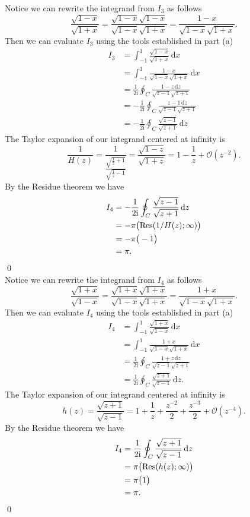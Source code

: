 \documentclass[10pt]{amsart}
\newcommand{\D}{\mathrm{d}}
\newcommand{\I}{\mathrm{i}}
\theoremstyle{nonumberplain}
\begin{document}
\begin{enumerate}[label={\bf {\arabic*}:}]
\begin{enumerate}
\noindent
Notice we can rewrite the integrand from $I_3$ as follows
$$
\frac{\sqrt{1 -x}}{ \sqrt{1 + x}} = \frac{\sqrt{1 -x}\sqrt{1 -x}}{\sqrt{1 -x}\sqrt{1 + x}} = \frac{1 - x}{\sqrt{1 - x}\sqrt{1 + x}}.
$$
Then we can evaluate $I_3$ using the tools established in part (a)
\begin{align*}
I_3 &= \int_{-1}^1 \frac{\sqrt{1 -x}}{ \sqrt{1 + x}}\, \D x \\
	&= \int_{-1}^1 \frac{1 - x}{\sqrt{1 - x}\sqrt{1 + x}}\, \D x \\
	&= \frac{1}{2\I} \oint_C \frac{1 - z\, \D z}{\sqrt{z -1} \sqrt{z + 1}} \\
	&= - \frac{1}{2\I} \oint_C \frac{z - 1\, \D z}{\sqrt{z -1} \sqrt{z + 1}} \\
	&= - \frac{1}{2\I} \oint_C \frac{\sqrt{z - 1}}{\sqrt{z + 1}}\, \D z
\end{align*}
The Taylor expansion of our integrand centered at infinity is
$$ \frac 1 {H(z)} = \frac 1 {\frac{\sqrt{\frac 1 z + 1}}{\sqrt{\frac 1 z - 1}}} = \frac{\sqrt{1 - z}}{\sqrt{1 + z}} = 1 - \frac 1 z + \mathcal O(z^{-2}). $$
By the Residue theorem we have
\begin{align*}
I_4 &= - \frac{1}{2\I} \oint_C \frac{\sqrt{z - 1}}{\sqrt{z + 1}}\, \D z \\
	&= -\pi \big( {\rm Res}( 1/H(z); \infty) \big) \\
	&= - \pi \big( -1 \big) \\
	&= \pi.
\end{align*}
\qed \\

\noindent
Notice we can rewrite the integrand from $I_4$ as follows
$$
\frac{\sqrt{1 + x}}{ \sqrt{1- x}} = \frac{\sqrt{1+ x}\sqrt{1+ x}}{\sqrt{1- x}\sqrt{1 + x}} = \frac{1 + x}{\sqrt{1 - x}\sqrt{1 + x}}.
$$
Then we can evaluate $I_4$ using the tools established in part (a)
\begin{align*}
I_4 &= \int_{-1}^1 \frac{\sqrt{1 + x}}{ \sqrt{1- x}}\, \D x \\
	&= \int_{-1}^1 \frac{1 + x}{\sqrt{1 - x}\sqrt{1 + x}}\, \D x \\
	&= \frac{1}{2\I} \oint_C \frac{1 + z\, \D z}{\sqrt{z -1} \sqrt{z + 1}} \\
	&= \frac{1}{2\I} \oint_C \frac{\sqrt{z + 1}}{\sqrt{z - 1}}\, \D z.
\end{align*}
The Taylor expansion of our integrand centered at infinity is
$$ h(z) = \frac{\sqrt{z + 1}}{\sqrt{z - 1}} = 1 + \frac 1 z + \frac {z^{-2}} 2 + \frac{z^{-3}} 2 + \mathcal O(z^{-4}). $$
By the Residue theorem we have
\begin{align*}
I_4 &= \frac{1}{2\I} \oint_C \frac{\sqrt{z + 1}}{\sqrt{z - 1}}\, \D z \\
	&= \pi \big( {\rm Res}( h(z); \infty) \big) \\
	&= \pi \big( 1 \big) \\
	&= \pi.
\end{align*}
\qed \\
\end{enumerate}
\newpage


\end{enumerate}
\end{document}
